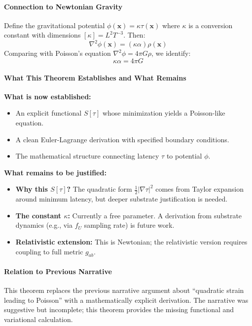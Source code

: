 \documentclass[11pt,titlepage]{article}
\begin{document}
\paragraph{Connection to Newtonian Gravity}
Define the gravitational potential $\phi(\mathbf{x}) = \kappa \tau(\mathbf{x})$ where $\kappa$ is a conversion constant with dimensions $[\kappa] = L^2 T^{-3}$. Then:
\[
\nabla^2 \phi(\mathbf{x}) = (\kappa \alpha) \rho(\mathbf{x})
\]
Comparing with Poisson's equation $\nabla^2 \phi = 4\pi G \rho$, we identify:
\[
\kappa \alpha = 4\pi G
\]

\paragraph{What This Theorem Establishes and What Remains}
\begin{tcolorbox}[colback=green!5!white,colframe=green!75!black,title=Status: Complete Toy Model Derivation]
\textbf{What is now established:}
\begin{itemize}
    \item An explicit functional $S[\tau]$ whose minimization yields a Poisson-like equation.
    \item A clean Euler-Lagrange derivation with specified boundary conditions.
    \item The mathematical structure connecting latency $\tau$ to potential $\phi$.
\end{itemize}

\textbf{What remains to be justified:}
\begin{itemize}
    \item \textbf{Why this $S[\tau]$?} The quadratic form $\frac{1}{2}|\nabla\tau|^2$ comes from Taylor expansion around minimum latency, but deeper substrate justification is needed.
    \item \textbf{The constant $\kappa$:} Currently a free parameter. A derivation from substrate dynamics (e.g., via $f_U$ sampling rate) is future work.
    \item \textbf{Relativistic extension:} This is Newtonian; the relativistic version requires coupling to full metric $g_{ab}$.
\end{itemize}
\end{tcolorbox}

\paragraph{Relation to Previous Narrative}
This theorem replaces the previous narrative argument about ``quadratic strain leading to Poisson'' with a mathematically explicit derivation. The narrative was suggestive but incomplete; this theorem provides the missing functional and variational calculation.
\end{document}
